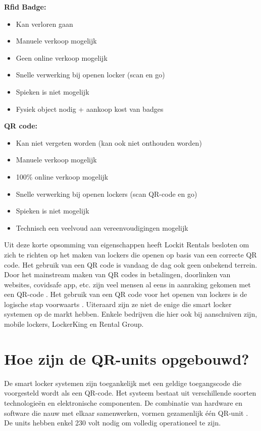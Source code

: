 \newpage
\textbf{Rfid Badge:}
\begin{itemize}
    \item Kan verloren gaan
    \item Manuele verkoop mogelijk
    \item Geen online verkoop mogelijk
    \item Snelle verwerking bij openen locker (scan en go)
    \item Spieken is niet mogelijk
    \item Fysiek object nodig + aankoop kost van badges    
\end{itemize}

\textbf{QR  code:}
\begin{itemize}
    \item Kan niet vergeten worden (kan ook niet onthouden worden)
    \item Manuele verkoop mogelijk
    \item 100\% online verkoop mogelijk
    \item Snelle verwerking bij openen lockers (scan QR-code en go)
    \item Spieken is niet mogelijk
    \item Technisch een veelvoud aan vereenvoudigingen mogelijk    
\end{itemize}

Uit deze korte opsomming van eigenschappen heeft Lockit Rentals besloten om zich te richten op het maken van lockers die openen op basis van een correcte QR code. Het gebruik van een QR code is vandaag de dag ook geen onbekend terrein. Door het mainstream maken van QR codes in betalingen, doorlinken van websites, covidsafe app, etc. zijn veel mensen al eens in aanraking gekomen met een QR-code \autocite{Belle2023}. Het gebruik van een QR code voor het openen van lockers is de logische stap voorwaarts \autocite{Lo2014}.
Uiteraard zijn ze niet de enige die smart locker systemen op de markt hebben. Enkele bedrijven die hier ook bij aanschuiven zijn, mobile lockers, LockerKing en Rental Group.

\section{Hoe zijn de QR-units opgebouwd?}%
\label{sec:QR-units}
De smart locker systemen zijn toegankelijk met een geldige toegangscode die voorgesteld wordt als een QR-code. Het systeem bestaat uit verschillende soorten technologieën en elektronische componenten. De combinatie van hardware en software die nauw met elkaar samenwerken, vormen gezamenlijk één QR-unit \autocite{Jadhav2016} . De units hebben enkel 230 volt nodig om volledig operationeel te zijn. 

